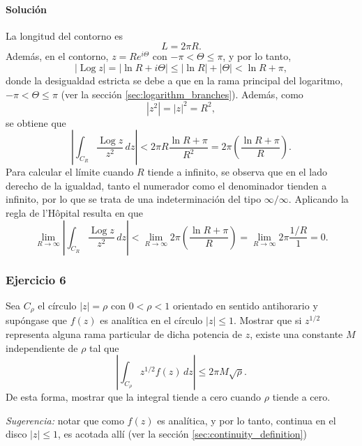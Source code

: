 \documentclass[a4paper]{report}
\DeclareMathOperator{\Log}{Log}
\begin{document}
\paragraph{Solución} La longitud del contorno es 
\[
 L=2\pi R.
\]
Además, en el contorno, \(z=Re^{i\Theta}\) con \(-\pi<\Theta\leq\pi\), y por lo tanto,
\[
 |\Log z|=|\ln R+i\Theta|\leq|\ln R|+|\Theta|<\ln R+\pi,
\]
donde la desigualdad estricta se debe a que en la rama principal del logaritmo, \(-\pi<\Theta\leq\pi\) (ver la sección \ref{sec:logarithm_branches}). Además, como
\[
 |z^2|=|z|^2=R^2,
\]
se obtiene que 
\[
 \left|\int_{C_R}\frac{\Log z}{z^2}\,dz\right|<2\pi R\frac{\ln R+\pi}{R^2}=2\pi\left(\frac{\ln R+\pi}{R}\right).
\]
Para calcular el límite cuando \(R\) tiende a infinito, se observa que en el lado derecho de la igualdad, tanto el numerador como el denominador tienden a infinito, por lo que se trata de una indeterminación del tipo \(\infty/\infty\). Aplicando la regla de l'Hôpital resulta en que 
\[
 \lim_{R\to\infty}\left|\int_{C_R}\frac{\Log z}{z^2}\,dz\right|<\lim_{R\to\infty}2\pi\left(\frac{\ln R+\pi}{R}\right)=\lim_{R\to\infty}2\pi\frac{1/R}{1}=0.
\]

\subsubsection{Ejercicio 6}

Sea \(C_\rho\) el círculo \(|z|=\rho\) con \(0<\rho<1\) orientado en sentido antihorario y supóngase que \(f(z)\) es analítica en el círculo \(|z|\leq1\). Mostrar que si \(z^{1/2}\) representa alguna rama particular de dicha potencia de \(z\), existe una constante \(M\) independiente de \(\rho\) tal que 
\[
 \left|\int_{C_\rho}z^{1/2}f(z)\,dz\right|\leq2\pi M\sqrt{\rho}.
\]
De esta forma, mostrar que la integral tiende a cero cuando \(\rho\) tiende a cero.

\emph{Sugerencia:} notar que como \(f(z)\) es analítica, y por lo tanto, continua en el disco \(|z|\leq1\), es acotada allí (ver la sección \ref{sec:continuity_definition})
\end{document}
